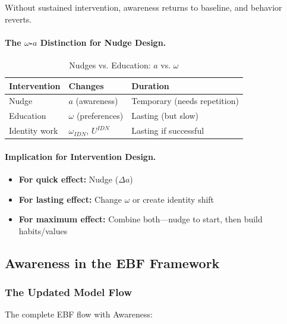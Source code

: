 Without sustained intervention, awareness returns to baseline, and behavior reverts.

\paragraph{The $\omega$-$a$ Distinction for Nudge Design.}

\begin{table}[htbp]
\centering
\caption{Nudges vs. Education: $a$ vs. $\omega$}
\label{tab:nudge-education}
\renewcommand{\arraystretch}{1.3}
\begin{tabular}{@{}lll@{}}
\toprule
\textbf{Intervention} & \textbf{Changes} & \textbf{Duration} \\
\midrule
Nudge & $a$ (awareness) & Temporary (needs repetition) \\
Education & $\omega$ (preferences) & Lasting (but slow) \\
Identity work & $\omega_{IDN}$, $U^{IDN}$ & Lasting if successful \\
\bottomrule
\end{tabular}
\end{table}

\paragraph{Implication for Intervention Design.}
\begin{itemize}
\item \textbf{For quick effect:} Nudge ($\Delta a$)
\item \textbf{For lasting effect:} Change $\omega$ or create identity shift
\item \textbf{For maximum effect:} Combine both---nudge to start, then build habits/values
\end{itemize}

\subsection{Awareness in the EBF Framework}
\label{subsec:awareness-bcm}

\subsubsection{The Updated Model Flow}

The complete EBF flow with Awareness:

